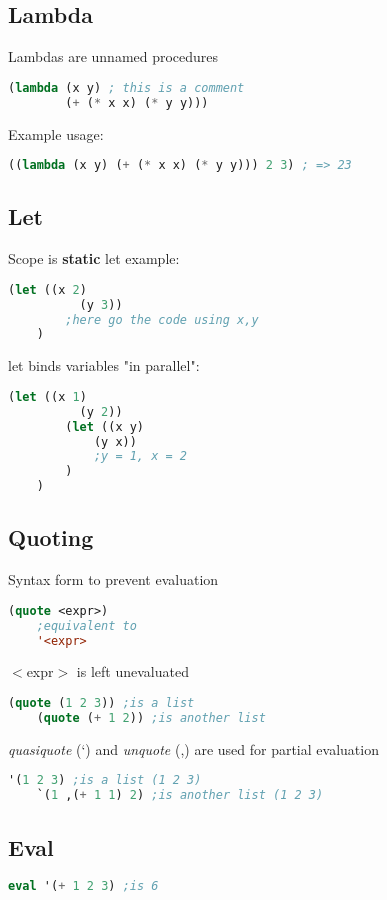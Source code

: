 

\subsection{Lambda}
Lambdas are unnamed procedures
\begin{lstlisting}[language=Lisp]
    (lambda (x y) ; this is a comment
        (+ (* x x) (* y y)))
\end{lstlisting}
Example usage:
\begin{lstlisting}[language=Lisp]
    ((lambda (x y) (+ (* x x) (* y y))) 2 3) ; => 23
\end{lstlisting}

\subsection{Let}
Scope is \textbf{static}
let example:
\begin{lstlisting}[language=Lisp]
    (let ((x 2)
          (y 3))
        ;here go the code using x,y
    )
\end{lstlisting}
let binds variables "in parallel":
\begin{lstlisting}[language=Lisp]
    (let ((x 1)
          (y 2))
        (let ((x y)
            (y x))
            ;y = 1, x = 2 
        )   
    )
\end{lstlisting}

\subsection{Quoting}
Syntax form to prevent evaluation
\begin{lstlisting}[language=Lisp]
    (quote <expr>)
    ;equivalent to
    '<expr>
\end{lstlisting}
$<$expr$>$ is left unevaluated
\begin{lstlisting}[language=Lisp]
    (quote (1 2 3)) ;is a list
    (quote (+ 1 2)) ;is another list
\end{lstlisting}
\textit{quasiquote} (‘) and \textit{unquote} (,) are used for partial evaluation
\begin{lstlisting}[language=Lisp]
    '(1 2 3) ;is a list (1 2 3)
    `(1 ,(+ 1 1) 2) ;is another list (1 2 3)
\end{lstlisting}

\subsection{Eval}
\begin{lstlisting}[language=Lisp]
    eval '(+ 1 2 3) ;is 6
\end{lstlisting}

